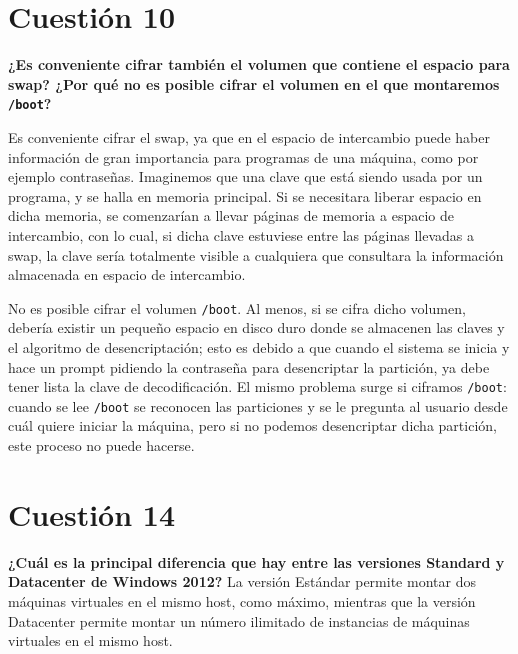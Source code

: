 \documentclass[a4paper,11pt]{article}
\newenvironment{answer}{%
\begin{list}{}{%
\addtolength{\hoffset}{0cm}
}%
\item[]}{\end{list}}
\begin{document}
\section{Cuestión 10}
\textbf{¿Es conveniente cifrar también el volumen que contiene el espacio para swap? ¿Por qué no es posible cifrar 
el volumen en el que montaremos \texttt{/boot}?}
\begin{answer}
 Es conveniente cifrar el swap, ya que en el espacio de intercambio puede haber información de gran importancia para
 programas de una máquina, como por ejemplo contraseñas. Imaginemos que una clave que está siendo usada por un programa,
 y se halla en memoria principal. Si se necesitara liberar espacio en dicha memoria, se comenzarían a llevar páginas
 de memoria a espacio de intercambio, con lo cual, si dicha clave estuviese entre las páginas llevadas a swap, la clave
 sería totalmente visible a cualquiera que consultara la información almacenada en espacio de intercambio.
 
 \cite{boot} No es posible cifrar el volumen \texttt{/boot}. Al menos, si se cifra dicho volumen, debería existir un pequeño espacio
 en disco duro donde se almacenen las claves y el algoritmo de desencriptación; esto es debido a que cuando el sistema
 se inicia y hace un prompt pidiendo la contraseña para desencriptar la partición, ya debe tener lista la clave de
 decodificación. El mismo problema surge si ciframos \texttt{/boot}: cuando se lee \texttt{/boot} se reconocen las particiones
 y se le pregunta al usuario desde cuál quiere iniciar la máquina, pero si no podemos desencriptar dicha partición, este
 proceso no puede hacerse.
 
\end{answer}

\section{Cuestión 14}
\textbf{¿Cuál es la principal diferencia que hay entre las versiones Standard y Datacenter de Windows 2012?}
\cite{difstdat} La versión Estándar permite montar dos máquinas virtuales en el mismo host, como máximo, mientras que la
versión Datacenter permite montar un número ilimitado de instancias de máquinas virtuales en el mismo host.
\printbibliography
\end{document}
